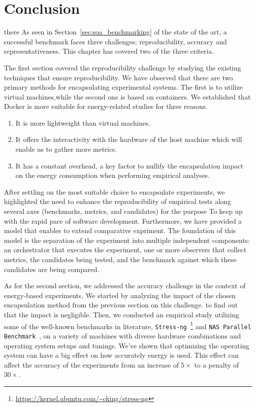 \section{Conclusion}
there As seen in Section~\cref{sec:soa_benchmarking} of the state of the art, a successful benchmark faces three challenges: reproducibility, accuracy and representativeness. 
This chapter has covered two of the three criteria.

The first section covered the reproducibility challenge by studying the existing techniques that ensure reproducibility. We have observed that there are two primary methods for encapsulating experimental systems. The first is to utilize virtual machines,while the second one is based on containers. We established that Docker is more suitable for energy-related studies for three reasons.

\begin{enumerate}
    \item It is more lightweight than virtual machines.
    \item It offers the interactivity with the hardware of the host machine which will enable us to gather more metrics.
    \item It has a constant overhead, a key factor to nullify the encapsulation impact on the energy consumption when performing empirical analyses.
\end{enumerate}

After settling on the most suitable choice to encapsulate experiments, we highlighted the need to enhance the reproducibility of empirical tests along several axes (benchmarks, metrics, and candidates) for the purpose To keep up with the rapid pace of software development. 
Furthermore, we have provided a model that enables to extend comparative expriment.
The foundation of this model is the separation of the experiment into multiple independent components: an orchestrator that executes the experiment, one or more observers that collect metrics, the candidates being tested, and the benchmark against which these candidates are being compared.

As for the second section, we addressed the accuracy challenge in the context of energy-based experiments.
We started by analyzing the impact of the chosen encapsulation method from the previous section on this challenge. to find out that the impact is negligible.
Then, we conducted an empirical study utilizing some of the well-known benchmarks in literature, \texttt{Stress-ng}~\footnote{\url{https://kernel.ubuntu.com/~cking/stress-ng}} and \texttt{NAS Parallel Benchmark}~\cite{Bailey:1991:NPB:125826.125925}, on a variety of machines with diverse hardware combinations and operating system setups and tunings. We've shown that optimizing the operating system can have a big effect on how accurately energy is used. This effect can affect the accuracy of the experiments  from an increase of $5\times$ to a penalty of $30\times$.

